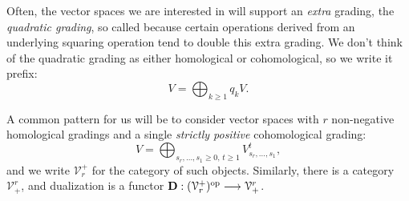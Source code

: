 \documentclass[11pt]{amsart}
\theoremstyle{plain}
\theoremstyle{definition}
\renewcommand{\to}{\longrightarrow}
\newcommand{\calV}{\mathcal{V}}
\theoremstyle{plain}
\newcommand{\vect}[2]{\calV^{#1}_{#2}}
\newcommand{\dual}{\mathbf{D}}
\begin{document}
\begin{Conventions and notation}
Often, the vector spaces we are interested in will support an \emph{extra} grading, the \emph{quadratic grading}, so called because certain operations derived from an underlying squaring operation tend to double this extra grading. We don't think of the quadratic grading as either homological or cohomological, so we write it prefix:
\[V=\textstyle\bigoplus_{k\geq1}q_kV.\]


A common pattern for us will be to consider vector spaces with $r$ non-negative homological gradings and a single \emph{strictly positive} cohomological grading:
\[V=\bigoplus_{s_r,\ldots,s_1\geq0,\,t\geq 1}V^{t}_{s_r,\ldots,s_1},\]
and we write $\vect{+}{r}$ for the category of such objects. Similarly, there is a category $\vect{r}{+}$, and  dualization is a functor $\dual:(\vect{+}{r})^\textup{op}\to\vect{r}{+}$.



\end{Conventions and notation}
\end{document}
